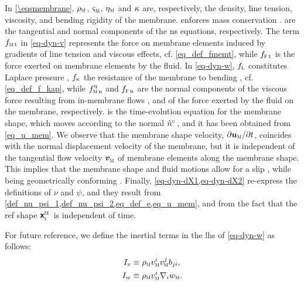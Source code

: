 In \cref{\eqsmembrane}, $\rhom$, $\sigmam{}$, $\etam$ and $\kappa$ are, respectively, the density, line tension, viscosity, and bending rigidity of the membrane.
 enforces mass conservation \cite{landauFluidMechanics1987}.
 are the tangential and normal components of the \ac{ns} equations, respectively.
The term $\fmemt$ in \cref{eq-dyn-v} represents the force on membrane elements induced by gradients of line tension and viscous effects, cf. \cref{eq_def_fmemt}, while $f_{\fluid\, \text{t}}$ is the force exerted on membrane elements by the fluid.
%
In \cref{eq-dyn-w}, $f_\lapl$ constitutes Laplace pressure \cite{degennesCapillarityWettingPhenomena2004,landauFluidMechanics1987},  $f_\kappa$  the resistance of the membrane to bending \cite{helfrichElasticPropertiesLipid1973}, cf. \cref{eq_def_f_kap},  while $\fetamemn$ and $\fflun$ are  the  normal components of the viscous force resulting from in-membrane flows \cite{arroyoRelaxationDynamicsFluid2009i}, and of the force exerted by the fluid on the membrane, respectively.
%
 is the time-evolution equation for the membrane shape, which moves according to the normal $\hat{n}^{\textrm{c}\, }$, and it has been obtained from  \cref{eq_u_mem}.
We observe that the membrane shape velocity, $\partial \bumem / \partial t$, coincides with the normal displacement velocity of the membrane, but  it is independent of the tangential flow velocity $\bvmem{}$ of membrane elements along the membrane shape.
This implies that the membrane shape and fluid motions allow for a slip \cite{landauFluidMechanics1987}, while  being geometrically conforming \cite{kamenskyLectureNotesMAE}.
%
Finally, \cref{eq-dyn-dX1,eq-dyn-dX2} re-express the definitions of $\nu$ and $\psi$, and  they result from \cref{def_nu_psi_1,def_nu_psi_2,eq_def_e,eq_u_mem}, and from the fact that the \ac{ref} shape $\bxmemr$ is independent of time.


For future reference, we define the inertial terms \cite{landauFluidMechanics1987} in  the \ac{lhs} of \cref{eq-dyn-w} as follows:
\begin{align}
    \label{eq_def_I_v}
    I_v & \equiv  \rhom \vmem{i}  \vmem{j} b_{ji}, \\
    \label{eq_def_I_w}
    I_w & \equiv  \rhom \vmem{i} \nabla_i \wmem.
\end{align}

